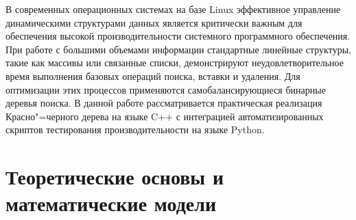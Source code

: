 \documentclass[coursework]{SCWorks}
\begin{document}

\date{2024}

\maketitle

\secNumbering

\tableofcontents




\intro

В современных операционных системах на базе Linux эффективное управление динамическими структурами данных является критически важным для обеспечения высокой производительности системного программного обеспечения. При работе с большими объемами информации стандартные линейные структуры, такие как массивы или связанные списки, демонстрируют неудовлетворительное время выполнения базовых операций поиска, вставки и удаления. Для оптимизации этих процессов применяются самобалансирующиеся бинарные деревья поиска. В данной работе рассматривается практическая реализация Красно"=черного дерева на языке C++ с интеграцией автоматизированных скриптов тестирования производительности на языке Python.

\section{Теоретические основы и математические модели}
\end{document}
